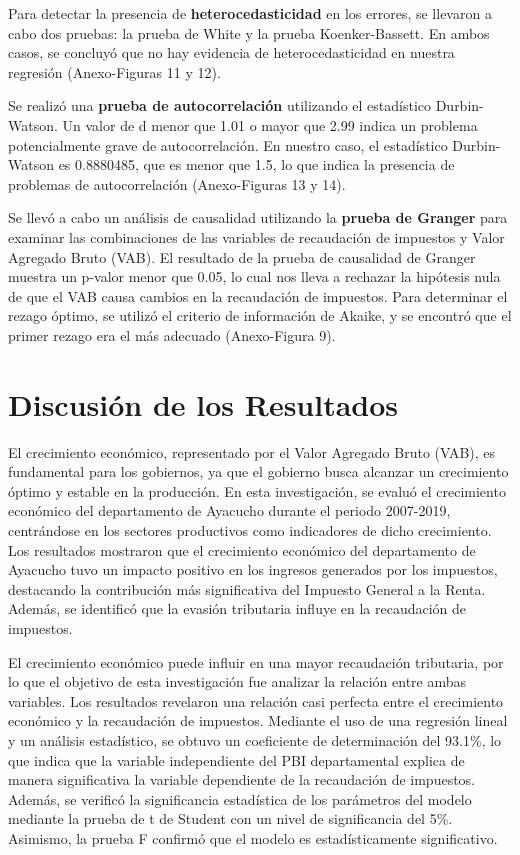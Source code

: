 \documentclass[
  jou,
  floatsintext,
  longtable,
  a4paper,
  nolmodern,
  notxfonts,
  notimes,
  12pt,
  colorlinks=true,linkcolor=blue,citecolor=blue,urlcolor=blue]{apa7}
\begin{document}
Para detectar la presencia de \textbf{heterocedasticidad} en los
errores, se llevaron a cabo dos pruebas: la prueba de White y la prueba
Koenker-Bassett. En ambos casos, se concluyó que no hay evidencia de
heterocedasticidad en nuestra regresión (Anexo-Figuras 11 y 12).

Se realizó una \textbf{prueba de autocorrelación} utilizando el
estadístico Durbin-Watson. Un valor de d menor que 1.01 o mayor que 2.99
indica un problema potencialmente grave de autocorrelación. En nuestro
caso, el estadístico Durbin-Watson es 0.8880485, que es menor que 1.5,
lo que indica la presencia de problemas de autocorrelación
(Anexo-Figuras 13 y 14).

Se llevó a cabo un análisis de causalidad utilizando la \textbf{prueba
de Granger} para examinar las combinaciones de las variables de
recaudación de impuestos y Valor Agregado Bruto (VAB). El resultado de
la prueba de causalidad de Granger muestra un p-valor menor que 0.05, lo
cual nos lleva a rechazar la hipótesis nula de que el VAB causa cambios
en la recaudación de impuestos. Para determinar el rezago óptimo, se
utilizó el criterio de información de Akaike, y se encontró que el
primer rezago era el más adecuado (Anexo-Figura 9).

\section{Discusión de los
Resultados}\label{discusiuxf3n-de-los-resultados}

El crecimiento económico, representado por el Valor Agregado Bruto
(VAB), es fundamental para los gobiernos, ya que el gobierno busca
alcanzar un crecimiento óptimo y estable en la producción. En esta
investigación, se evaluó el crecimiento económico del departamento de
Ayacucho durante el periodo 2007-2019, centrándose en los sectores
productivos como indicadores de dicho crecimiento. Los resultados
mostraron que el crecimiento económico del departamento de Ayacucho tuvo
un impacto positivo en los ingresos generados por los impuestos,
destacando la contribución más significativa del Impuesto General a la
Renta. Además, se identificó que la evasión tributaria influye en la
recaudación de impuestos.

El crecimiento económico puede influir en una mayor recaudación
tributaria, por lo que el objetivo de esta investigación fue analizar la
relación entre ambas variables. Los resultados revelaron una relación
casi perfecta entre el crecimiento económico y la recaudación de
impuestos. Mediante el uso de una regresión lineal y un análisis
estadístico, se obtuvo un coeficiente de determinación del 93.1\%, lo
que indica que la variable independiente del PBI departamental explica
de manera significativa la variable dependiente de la recaudación de
impuestos. Además, se verificó la significancia estadística de los
parámetros del modelo mediante la prueba de t de Student con un nivel de
significancia del 5\%. Asimismo, la prueba F confirmó que el modelo es
estadísticamente significativo.
\end{document}
